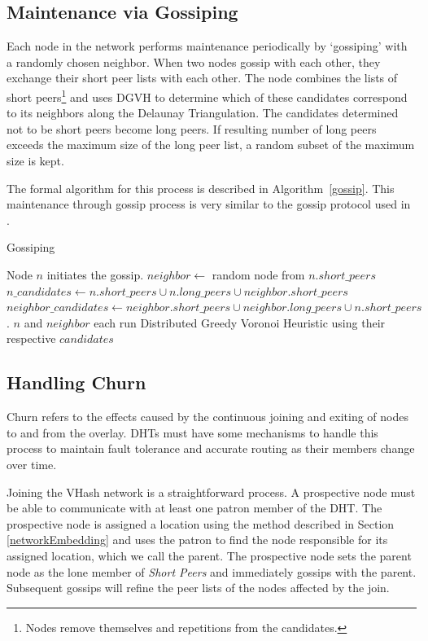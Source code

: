 \documentclass[10pt, conference, letterpaper]{IEEEtran}
\begin{document}
\subsection{Maintenance via Gossiping}
Each node in the network performs maintenance periodically by `gossiping' with a randomly chosen neighbor.
When two nodes gossip with each other, they exchange their short peer lists with each other.
The node combines the lists of short peers\footnote{Nodes remove themselves and repetitions from the candidates.} and uses DGVH to determine which of these candidates correspond to its neighbors along the Delaunay Triangulation.
The candidates determined not to be short peers become long peers.  
If resulting number of long peers exceeds the maximum size of the long peer list, a random subset of the maximum size is kept.

The formal algorithm for this process is described in Algorithm~\ref{gossip}.
This maintenance through gossip process is very similar to the gossip protocol used in \cite{raynet}.


\begin{algorithm}
\caption{Gossiping}
\label{gossip}
\begin{algorithmic}[1]  %
	\STATE Node $n$ initiates the gossip.
	\STATE $neighbor \leftarrow$ random node from $n.short\_peers$
   \STATE $n\_candidates \leftarrow n.short\_peers \cup n.long\_peers \cup neighbor.short\_peers$
   \STATE $neighbor\_candidates \leftarrow neighbor.short\_peers \cup neighbor.long\_peers \cup n.short\_peers$.  
   \STATE $n$ and $neighbor$ each run Distributed Greedy Voronoi Heuristic using their respective $candidates$
\end{algorithmic} 
\end{algorithm}



\subsection{Handling Churn}
Churn refers to the effects caused by the continuous joining and exiting of nodes to and from the overlay.
DHTs must have some mechanisms to handle this process to maintain fault tolerance and accurate routing as their members change over time.

Joining the VHash network is a straightforward process.  
A prospective node must be able to communicate with at least one patron member of the DHT.  
The prospective node is assigned a location using the method described in Section \ref{networkEmbedding} and uses the patron to find the node responsible for its assigned location, which we call the parent.
The prospective node sets the parent node as the lone member of \textit{Short Peers} and immediately gossips with the parent.
Subsequent gossips will refine the peer lists of the nodes affected by the join.
\end{document}
